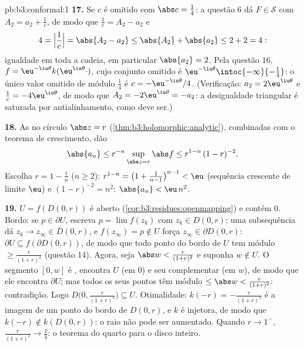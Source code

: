 \begin{solution}{pb:b3:conformal:1}
\textbf{17.} Se $c$ é omitido com $\abs c = \frac14$:
a questão 6 dá $F \in \mathcal S$ com $A_2 = a_2 +
\frac1c$, de modo que $\frac1c = A_2 - a_2$ e
\[
4 = \Bigl|\frac1c\Bigr| = \abs{A_2 - a_2}
\leq \abs{A_2} + \abs{a_2} \leq 2 + 2 = 4 :
\]
igualdade em toda a cadeia, em particular $\abs{a_2} = 2$. Pela
questão 16, $f = \eu^{-\iu\theta}k(\eu^{\iu\theta}\cdot)$,
cujo conjunto omitido é $\eu^{-\iu\theta}
\intoc{-\infty}{-\frac14}$: o único valor omitido de
módulo $\frac14$ é $c = -\eu^{-\iu\theta}/4$. (Verificação:
$a_2 = 2\eu^{\iu\theta}$ e $\frac1c = -4\eu^{\iu\theta}$,
de modo que $A_2 = -2\eu^{\iu\theta} = -a_2$: a desigualdade
triangular é saturada por antialinhamento, como deve ser.)

\textbf{18.} As  no círculo $\abs z =
r$ (\cref{thm:b3:holomorphic:analytic}), combinadas com o
teorema de crescimento, dão
\[
\abs{a_n} \leq r^{-n}\sup_{\abs z = r}\abs f
\leq r^{1-n}\,(1 - r)^{-2} .
\] Escolha $r = 1 - \frac1n$ ($n \geq
2$): $r^{1-n} = \bigl(1 + \frac1{n-1}\bigr)^{n-1} < \eu$
(sequência crescente de limite $\eu$) e $(1 - r)^{-2} =
n^2$: $\abs{a_n} < \eu\,n^2$.

\textbf{19.} $U = f(D(0, r))$ é aberto
(\cref{cor:b3:residues:openmapping}) e contém $0$.
Bordo: se $p \in \partial U$, escreva $p = \lim f(z_k)$
com $z_k \in D(0, r)$; uma subsequência dá $z_k \to z_\infty
\in \bar D(0, r)$, e $f(z_\infty) = p \notin U$ força
$z_\infty \in \partial D(0, r)$: $\partial U \subseteq
f(\partial D(0, r))$, de modo que todo ponto do bordo de $U$ tem
módulo $\geq \frac r{(1+r)^2}$ (questão 14). Agora, seja
$\abs w < \frac r{(1+r)^2}$ e suponha $w \notin U$. O
segmento $[0, w]$ é , encontra $U$ (em $0$) e seu
complementar (em $w$), de modo que ele encontra $\partial U$; mas todos os seus
pontos têm módulo $\leq \abs w < \frac r{(1+r)^2}$:
contradição. Logo $D\bigl(0, \frac r{(1+r)^2}\bigr)
\subseteq U$. Otimalidade: $k(-r) = -\frac r{(1+r)^2}$ é a
imagem de um ponto do bordo de $D(0,r)$, e $k$ é injetora,
de modo que $k(-r) \notin k(D(0, r))$: o raio não pode ser
aumentado. Quando $r \to 1^-$, $\frac r{(1+r)^2} \to \frac14$:
o teorema do quarto para o disco inteiro.


\end{solution}
